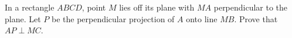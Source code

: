 In a rectangle $ABCD$, point $M$ lies off its plane with $MA$ perpendicular to the plane. Let $P$ be the perpendicular projection of $A$ onto line $MB$. Prove that $AP\perp MC$.
